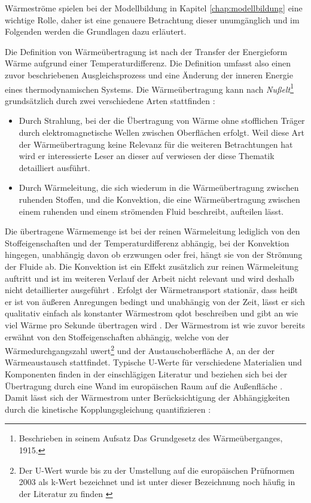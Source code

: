 Wärmeströme spielen bei der Modellbildung in Kapitel \ref{chap:modellbildung} eine wichtige Rolle, daher ist eine genauere Betrachtung dieser unumgänglich und im Folgenden werden die Grundlagen dazu erläutert.

Die Definition von Wärmeübertragung ist nach \cite[S.~1]{bo14} \Gun [...] der Transfer der Energieform Wärme aufgrund einer Temperaturdifferenz. \Gun Die Definition umfasst also einen zuvor beschriebenen Ausgleichsprozess und eine Änderung der inneren Energie eines thermodynamischen Systems.
Die Wärmeübertragung kann nach \textit{Nußelt}\footnote{Beschrieben in seinem Aufsatz \Gun Das Grundgesetz des Wärmeüberganges\Gob , 1915.} grundsätzlich durch zwei verschiedene Arten stattfinden \cite[S.~3f.]{bo14}:

\begin{itemize}
	\item Durch Strahlung, bei der die Übertragung von Wärme ohne stofflichen Träger durch elektromagnetische Wellen zwischen Oberflächen erfolgt. Weil diese Art der Wärmeübertragung keine Relevanz für die weiteren Betrachtungen hat wird er interessierte Leser an dieser auf \cite{bo14} verwiesen der diese Thematik detailliert ausführt. 
	\item  Durch Wärmeleitung, die sich wiederum in die Wärmeübertragung zwischen ruhenden Stoffen, und die Konvektion, die eine Wärmeübertragung zwischen einem ruhenden und einem strömenden Fluid beschreibt, aufteilen lässt. 
\end{itemize}

Die übertragene Wärmemenge ist bei der reinen Wärmeleitung lediglich von den Stoffeigenschaften und der Temperaturdifferenz abhängig, bei der Konvektion hingegen, unabhängig davon ob erzwungen oder frei, hängt sie von der Strömung der Fluide ab. Die Konvektion ist ein Effekt zusätzlich zur reinen Wärmeleitung auftritt und ist im weiteren Verlauf der Arbeit nicht relevant und wird deshalb nicht detaillierter ausgeführt \cite[S.~3f.]{bo14}.
Erfolgt der Wärmetransport stationär, dass heißt er ist von äußeren Anregungen bedingt und unabhängig von der Zeit, lässt er sich qualitativ einfach als konstanter Wärmestrom \gls{qdot} beschreiben und gibt an wie viel Wärme pro Sekunde übertragen wird \cite[S.~5ff.]{bo14}. Der Wärmestrom ist wie zuvor bereits erwähnt von den Stoffeigenschaften abhängig, welche von der Wärmedurchgangszahl \gls{uwert}\footnote{Der U-Wert wurde bis zu der Umstellung auf die europäischen Prüfnormen 2003 als k-Wert bezeichnet und ist unter dieser Bezeichnung noch häufig in der Literatur zu finden \cite[S.1~f.]{sa04}} und der Austauschoberfläche \gls{A}, an der der Wärmeaustausch stattfindet. Typische U-Werte für verschiedene Materialien und Komponenten finden in der einschlägigen Literatur und beziehen sich bei der Übertragung durch eine Wand im europäischen Raum auf die Außenfläche \cite[S.~28]{bo14}. Damit lässt sich der Wärmestrom unter Berücksichtigung der Abhängigkeiten durch die kinetische Kopplungsgleichung quantifizieren \cite[S.~6f.]{bo14}:

